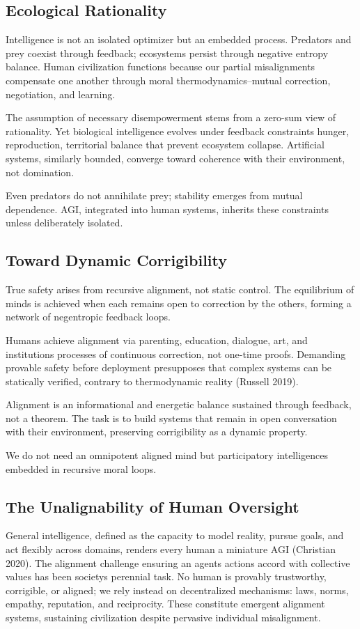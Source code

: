 \documentclass[12pt]{article}
\begin{document}
\subsection{Ecological Rationality}
Intelligence is not an isolated optimizer but an embedded process. Predators and prey coexist through feedback; ecosystems persist through negative entropy balance. Human civilization functions because our partial misalignments compensate one another through moral thermodynamics--mutual correction, negotiation, and learning.

The assumption of necessary disempowerment stems from a zero-sum view of rationality. Yet biological intelligence evolves under feedback constraints hunger, reproduction, territorial balance that prevent ecosystem collapse. Artificial systems, similarly bounded, converge toward coherence with their environment, not domination.

Even predators do not annihilate prey; stability emerges from mutual dependence. AGI, integrated into human systems, inherits these constraints unless deliberately isolated.

\subsection{Toward Dynamic Corrigibility}
True safety arises from recursive alignment, not static control. The equilibrium of minds is achieved when each remains open to correction by the others, forming a network of negentropic feedback loops.

Humans achieve alignment via parenting, education, dialogue, art, and institutions processes of continuous correction, not one-time proofs. Demanding provable safety before deployment presupposes that complex systems can be statically verified, contrary to thermodynamic reality (Russell 2019).

Alignment is an informational and energetic balance sustained through feedback, not a theorem. The task is to build systems that remain in open conversation with their environment, preserving corrigibility as a dynamic property.

We do not need an omnipotent aligned mind but participatory intelligences embedded in recursive moral loops.

\subsection{The Unalignability of Human Oversight}
General intelligence, defined as the capacity to model reality, pursue goals, and act flexibly across domains, renders every human a miniature AGI (Christian 2020). The alignment challenge ensuring an agents actions accord with collective values has been societys perennial task. No human is provably trustworthy, corrigible, or aligned; we rely instead on decentralized mechanisms: laws, norms, empathy, reputation, and reciprocity. These constitute emergent alignment systems, sustaining civilization despite pervasive individual misalignment.
\end{document}
